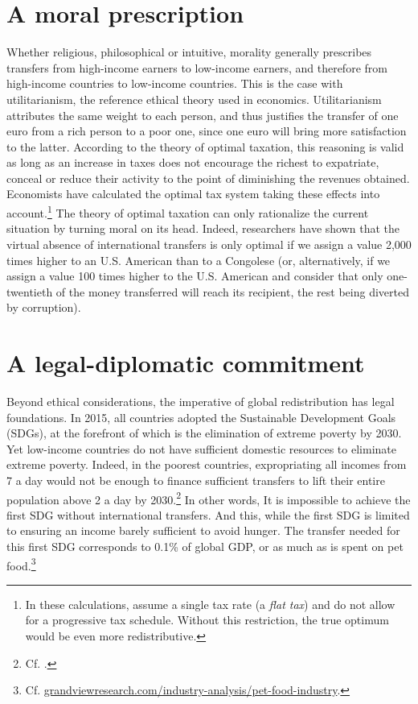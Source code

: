 \documentclass[a5paper,english,openany]{memoir}
\begin{document}
\section{A moral prescription}
Whether religious, philosophical or intuitive, morality generally prescribes transfers from high-income earners to low-income earners, and therefore from high-income countries to low-income countries. This is the case with utilitarianism, the reference ethical theory used in economics. Utilitarianism attributes the same weight to each person, and thus justifies the transfer of one euro from a rich person to a poor one, since one euro will bring more satisfaction to the latter. According to the theory of optimal taxation, this reasoning is valid as long as an increase in taxes does not encourage the richest to expatriate, conceal or reduce their activity to the point of diminishing the revenues obtained. Economists have calculated the optimal tax system taking these effects into account.\footnote{In these calculations, \citet{kopczuk_limitations_2005} assume a single tax rate (a \textit{flat tax}) and do not allow for a progressive tax schedule. Without this restriction, the true optimum would be even more redistributive.} %
The theory of optimal taxation can only rationalize the current situation by turning moral on its head. Indeed, researchers have shown that the virtual absence of international transfers is only optimal if we assign a value 2,000 times higher to an U.S. American than to a Congolese (or, alternatively, if we assign a value 100 times higher to the U.S. American and consider that only one-twentieth of the money transferred will reach its recipient, the rest being diverted by corruption). %

\section{A legal-diplomatic commitment}
Beyond ethical considerations, the imperative of global redistribution has legal foundations. In 2015, all countries adopted the Sustainable Development Goals (SDGs), at the forefront of which is the elimination of extreme poverty by 2030. Yet low-income countries do not have sufficient domestic resources to eliminate extreme poverty. Indeed, in the poorest countries, expropriating all incomes from 7\textit{\texteuro} a day would not be enough to finance sufficient transfers to lift their entire population above 2\textit{\texteuro} a day by 2030.\footnote{Cf. \citet{fabre_shortfall_2024}.} %
In other words, It is impossible to achieve the first SDG without international transfers. And this, while the first SDG is limited to ensuring an income barely sufficient to avoid hunger. The transfer needed for this first SDG corresponds to 0.1\% of global GDP, or as much as is spent on pet food.\footnote{Cf. \href{https://www.grandviewresearch.com/industry-analysis/pet-food-industry}{grandviewresearch.com/industry-analysis/pet-food-industry}.} %
\end{document}
